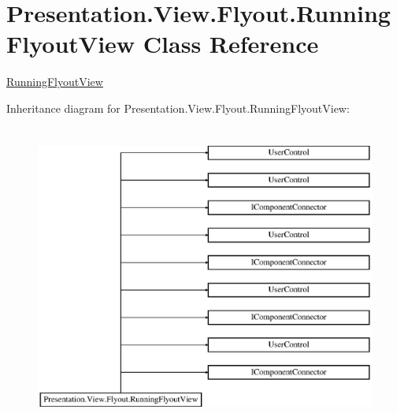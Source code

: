 \hypertarget{class_presentation_1_1_view_1_1_flyout_1_1_running_flyout_view}{}\section{Presentation.\+View.\+Flyout.\+Running\+Flyout\+View Class Reference}
\label{class_presentation_1_1_view_1_1_flyout_1_1_running_flyout_view}


\hyperlink{class_presentation_1_1_view_1_1_flyout_1_1_running_flyout_view}{Running\+Flyout\+View}  


Inheritance diagram for Presentation.\+View.\+Flyout.\+Running\+Flyout\+View\+:\begin{figure}[H]
\begin{center}
\leavevmode
\includegraphics[height=10.000000cm]{class_presentation_1_1_view_1_1_flyout_1_1_running_flyout_view}
\end{center}
\end{figure}

